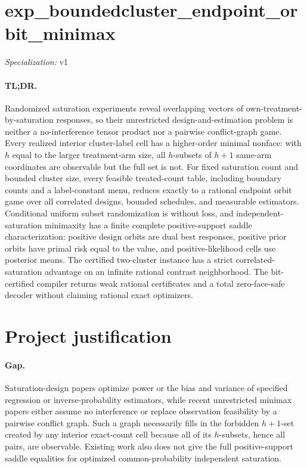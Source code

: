 \documentclass{article}
\begin{document}
\sloppy

\section*{exp\_\allowbreak{}boundedcluster\_\allowbreak{}endpoint\_\allowbreak{}orbit\_\allowbreak{}minimax}

\noindent\textit{Specialization:} v1\par

\paragraph{TL;DR.} Randomized saturation experiments reveal overlapping vectors of own-treatment-by-saturation responses, so their unrestricted design-and-estimation problem is neither a no-interference tensor product nor a pairwise conflict-graph game. Every realized interior cluster-label cell has a higher-order minimal nonface: with \(h\) equal to the larger treatment-arm size, all \(h\)-subsets of \(h+1\) same-arm coordinates are observable but the full set is not. For fixed saturation count and bounded cluster size, every feasible treated-count table, including boundary counts and a label-constant menu, reduces exactly to a rational endpoint orbit game over all correlated designs, bounded schedules, and measurable estimators. Conditional uniform subset randomization is without loss, and independent-saturation minimaxity has a finite complete positive-support saddle characterization: positive design orbits are dual best responses, positive prior orbits have primal risk equal to the value, and positive-likelihood cells use posterior means. The certified two-cluster instance has a strict correlated-saturation advantage on an infinite rational contrast neighborhood. The bit-certified compiler returns weak rational certificates and a total zero-face-safe decoder without claiming rational exact optimizers.

\section{Project justification}

\paragraph{Gap.} Saturation-design papers optimize power or the bias and variance of specified regression or inverse-probability estimators, while recent unrestricted minimax papers either assume no interference or replace observation feasibility by a pairwise conflict graph. Such a graph necessarily fills in the forbidden \(h+1\)-set created by any interior exact-count cell because all of its \(h\)-subsets, hence all pairs, are observable. Existing work also does not give the full positive-support saddle equalities for optimized common-probability independent saturation.
\end{document}
